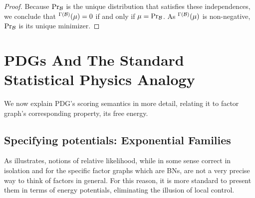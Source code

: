 \documentclass{article}
\theoremstyle{plain}
\theoremstyle{definition}
\theoremstyle{remark}
\let\H\relax
\DeclareMathOperator{\H}{\mathrm{H}} %
\newcommand\PDGof{\Gamma}
\numberwithin{equation}{section}
\begin{document}
\begin{proof}
		Because $\Pr_{\cal B}$ is the unique distribution that satisfies these independences, we conclude that $\H^{\PDGof(\cal B)}(\mu) = 0$ if and only if $\mu = \Pr_{\cal B}$. 	
		As $\H^{\PDGof(\cal B)}(\mu)$ is non-negative, $\Pr_{\cal B}$ is its unique minimizer. 
		
		
	\end{proof}
	\section{PDGs And The Standard Statistical Physics Analogy}
	We now explain PDG's scoring semantics in more detail, relating it to factor graph's corresponding property, its free energy.
	
	\subsection{Specifying potentials: Exponential
          Families}\label{sec:fg-expfam}

	As  illustrates, notions of relative likelihood, while in some sense correct in isolation and for the specific factor graphs which are BNs, are not a very precise way to think of factors in general. 
	For this reason, it is more standard to present them in terms of energy potentials, eliminating the illusion of local control. 
	
\end{document}
